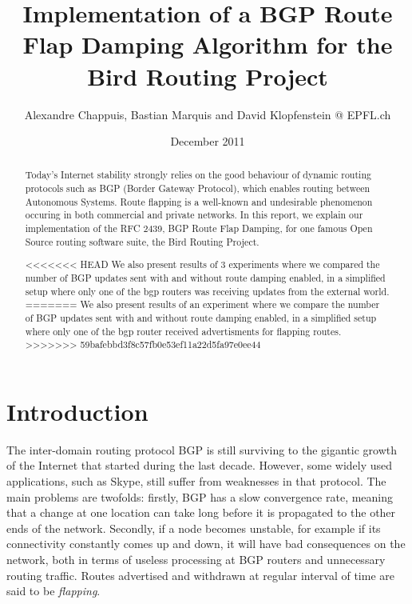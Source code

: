 \documentclass[a4paper,english]{IEEEtran}
\begin{document}
\date{December 2011}

\author{Alexandre Chappuis, Bastian Marquis and David Klopfenstein @ EPFL.ch}

\title{Implementation of a BGP Route Flap Damping Algorithm for the Bird
Routing Project}

\maketitle

\begin{abstract}
Today's Internet stability strongly relies on the good behaviour of
dynamic routing protocols such as BGP (Border Gateway Protocol), which
enables routing between Autonomous Systems. Route flapping is a well-known
and undesirable phenomenon occuring in both commercial and private
networks. In this report, we explain our implementation of the RFC
2439, BGP Route Flap Damping, for one famous Open Source routing software
suite, the Bird Routing Project.

<<<<<<< HEAD
We also present results of 3 experiments where we compared the number
of BGP updates sent with and without route damping enabled, in a simplified setup
where only one of the bgp routers was receiving updates from the external world.
=======
We also present results of an experiment where we compare the number
of BGP updates sent with and without route damping enabled, in a simplified setup
where only one of the bgp router received advertisments for flapping
routes.
>>>>>>> 59bafebbd3f8c57fb0e53ef11a22d5fa97e0ee44
\end{abstract}

\section{Introduction}

The inter-domain routing protocol BGP is still surviving to the gigantic
growth of the Internet that started during the last decade. However,
some widely used applications, such as Skype, still suffer from weaknesses
in that protocol. The main problems are twofolds: firstly, BGP has
a slow convergence rate, meaning that a change at one location can take
long before it is propagated to the other ends of the network.
Secondly, if a node becomes unstable, for example if its connectivity
constantly comes up and down, it will have bad consequences on the
network, both in terms of useless processing at BGP routers and unnecessary
routing traffic. Routes advertised and withdrawn at regular interval
of time are said to be \textit{flapping}.
\end{document}
